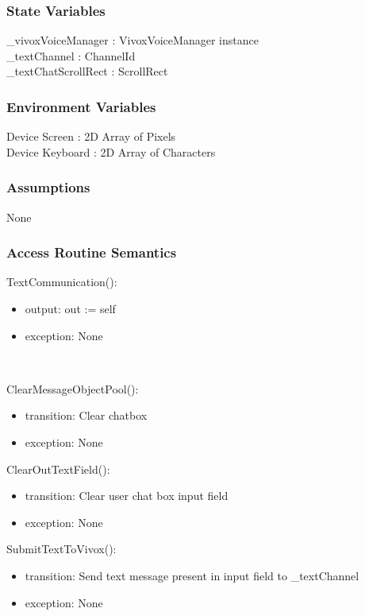 \documentclass[12pt, titlepage]{article}
\begin{document}
\subsubsection{State Variables}
\_vivoxVoiceManager : VivoxVoiceManager instance\\
\_textChannel : ChannelId\\
\_textChatScrollRect : ScrollRect\\

\subsubsection{Environment Variables}

Device Screen : 2D Array of Pixels\\
Device Keyboard : 2D Array of Characters

\subsubsection{Assumptions}

None\\

\subsubsection{Access Routine Semantics}

\noindent TextCommunication():
\begin{itemize}
\item output: out := self
\item exception: None
\end{itemize}\

\noindent ClearMessageObjectPool():
\begin{itemize}
\item transition: Clear chatbox
\item exception: None
\end{itemize}


\noindent ClearOutTextField():
\begin{itemize}
\item transition: Clear user chat box input field
\item exception: None
\end{itemize}

\noindent SubmitTextToVivox():
\begin{itemize}
\item transition: Send text message present in input field to \_textChannel
\item exception: None
\end{itemize}
\end{document}
